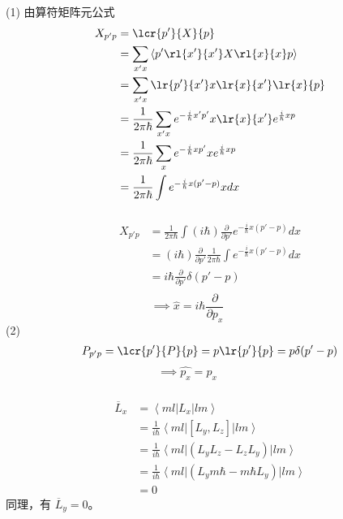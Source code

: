 \begin{frame}[label=current]
  \frametitle{}
\解 (1) 由算符矩阵元公式\[ \begin{aligned}
     X_{p'p} &= \lcr{p'}{X}{p}\\
     &= \sum_{x'x} \left \langle p' \rl{x'}{x'}X\rl{x}{x} p \right \rangle \\
     &= \sum_{x'x} \lr{p'}{x'}x \lr{x}{x'} \lr{x}{p} \\
     &= \frac{1}{2\pi \hbar}\sum_{x'x} e^{-\frac{i}{\hbar}x'p'} x \lr{x}{x'} e^{\frac{i}{\hbar}xp} \\
     &= \frac{1}{2\pi \hbar}\sum_{x} e^{-\frac{i}{\hbar}xp'} x  e^{\frac{i}{\hbar}xp} \\
     &= \frac{1}{2\pi \hbar}\int e^{-\frac{i}{\hbar}x(p'-p)} x  dx\\
\end{aligned}\]
\end{frame} 

\begin{frame}[label=current]
  \frametitle{}
  \[ \begin{aligned}
    X_{p'p} &= \frac{1}{2\pi \hbar}\int (i\hbar) \frac{\partial }{\partial p'}e^{-\frac{i}{\hbar}x(p'-p)}  dx \\
    &= (i\hbar) \frac{\partial }{\partial p'} \frac{1}{2\pi \hbar}\int e^{-\frac{i}{\hbar}x(p'-p)}  dx \\
    &= i\hbar \frac{\partial }{\partial p'} \delta(p'-p) \\
  \end{aligned}
  \]
  \[\implies \hat{x} = i\hbar \frac{\partial }{\partial p_x} \qquad \qquad  \]
 (2)   \[ \begin{aligned}
    P_{p'p} = \lcr{p'}{P}{p} = p\lr{p'}{p} = p \delta(p'-p)
  \end{aligned}
  \] 
  \[\implies \hat{p_x} = p_x \qquad \qquad  \]
\end{frame} 
\begin{frame}[label=current]
  \frametitle{}
  \证 \[ \begin{aligned}
    \overline{L}_x &= \left\langle ml \right\vert L_x \left\vert lm \right\rangle\\ 
    &= \frac{1}{i \hbar} \left\langle ml \right\vert [L_y, L_z] \left\vert lm \right\rangle\\
    &= \frac{1}{i \hbar} \left\langle ml \right\vert (L_yL_z - L_zL_y) \left\vert lm \right\rangle\\
    &= \frac{1}{i \hbar} \left\langle ml \right\vert (L_y m \hbar - m \hbar L_y) \left\vert lm \right\rangle\\
    &=0 
  \end{aligned}\]
  同理，有 $\overline{L}_y = 0$。
\end{frame} 


